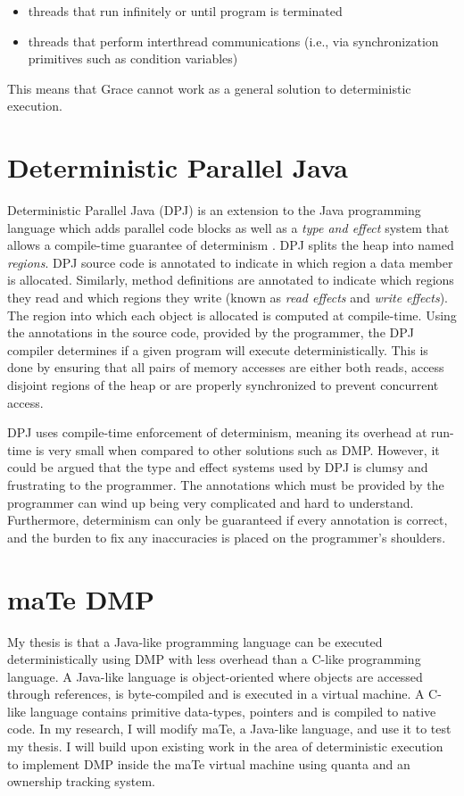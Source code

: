 \begin{itemize}
\item threads that run infinitely or until program is terminated

\item threads that perform interthread communications (i.e., via
  synchronization primitives such as condition variables)
\end{itemize}

This means that Grace cannot work as a general solution to
deterministic execution.

\section{Deterministic Parallel Java}

Deterministic Parallel Java (DPJ) is an extension to the Java
programming language which adds parallel code blocks as well as a
\emph{type and effect} system that allows a compile-time guarantee of
determinism \cite{dpj}.  DPJ splits the heap into named
\emph{regions}.  DPJ source code is annotated to indicate in which
region a data member is allocated.  Similarly, method definitions are
annotated to indicate which regions they read and which regions they
write (known as \emph{read effects} and \emph{write effects}).  The
region into which each object is allocated is computed at
compile-time.  Using the annotations in the source code, provided by
the programmer, the DPJ compiler determines if a given program will
execute deterministically.  This is done by ensuring that all pairs of
memory accesses are either both reads, access disjoint regions of the
heap or are properly synchronized to prevent concurrent access.

DPJ uses compile-time enforcement of determinism, meaning its overhead
at run-time is very small when compared to other solutions such as
DMP.  However, it could be argued that the type and effect systems
used by DPJ is clumsy and frustrating to the programmer.  The
annotations which must be provided by the programmer can wind up being
very complicated and hard to understand.  Furthermore, determinism can
only be guaranteed if every annotation is correct, and the burden to
fix any inaccuracies is placed on the programmer's shoulders.

\section{maTe DMP}

My thesis is that a Java-like programming language can be executed
deterministically using DMP with less overhead than a C-like
programming language.  A Java-like language is object-oriented where
objects are accessed through references, is byte-compiled and is
executed in a virtual machine.  A C-like language contains primitive
data-types, pointers and is compiled to native code.  In my research,
I will modify maTe, a Java-like language, and use it to test my
thesis.  I will build upon existing work in the area of deterministic
execution to implement DMP inside the maTe virtual machine using
quanta and an ownership tracking system.

